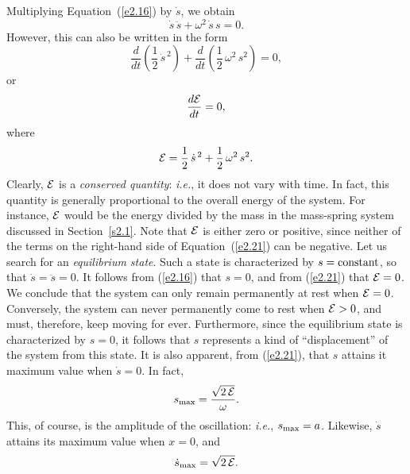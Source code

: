 Multiplying Equation~(\ref{e2.16}) by $\dot{s}$, we obtain
\begin{equation}
\dot{s}\,\ddot{s} + \omega^2\,\dot{s}\,s=0.
\end{equation}
However, this can also be written in the form
\begin{equation}
\frac{d}{dt}\!\left(\frac{1}{2}\,\dot{s}^{\,2}\right) +\frac{d}{dt}\!\left(
\frac{1}{2}\,\omega^2\,s^2\right)=0,
\end{equation}
or
\begin{equation}
\frac{d{\cal E}}{dt} = 0,
\end{equation}
where
\begin{equation}\label{e2.21}
{\cal E} = \frac{1}{2}\,\dot{s}^{\,2} + \frac{1}{2}\,\omega^2\,s^2.
\end{equation}
Clearly, ${\cal E}$ is a {\em conserved quantity}: {\em i.e.}, it does not vary with time. In fact, this quantity is
generally proportional to the overall energy of the system. For instance, ${\cal E}$ would be the energy divided by the mass in
the mass-spring system discussed in Section~\ref{s2.1}. Note that ${\cal E}$ is either
zero or positive, since neither of the terms on the right-hand side of Equation~(\ref{e2.21}) can be negative. Let us search for an {\em equilibrium state}. Such a state is
characterized by $s= {\rm constant}$, so that $\dot{s}=\ddot{s}=0$. It follows
from (\ref{e2.16}) that $s=0$, and from (\ref{e2.21}) that ${\cal E}=0$. We conclude that   the system  can only remain permanently at
rest when ${\cal E}=0$.
 Conversely,  the system can
never permanently come to rest when ${\cal E}>0$,  and must, therefore, keep moving for ever. Furthermore, since the equilibrium state is characterized by $s=0$, it follows that
$s$ represents a kind of  ``displacement'' of the system from this state.
It is also apparent, from (\ref{e2.21}), that $s$ attains it maximum value when $\dot{s}=0$.
In fact,
\begin{equation}
s_{\rm max} = \frac{\sqrt{2\,{\cal E}}}{\omega}.
\end{equation}
This, of course, is the amplitude of the oscillation: {\em i.e.}, $s_{\rm max}=a$. 
Likewise, $\dot{s}$ attains its maximum value when $x=0$, and
\begin{equation}
\dot{s}_{\rm max} = \sqrt{2\,{\cal E}}.
\end{equation}

